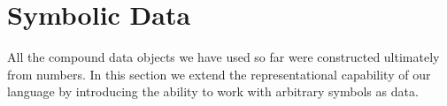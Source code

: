 \section{Symbolic Data}
\label{Section 2.3}

All the compound data objects we have used so far were constructed ultimately from numbers.
In this section we extend the representational capability of our language by introducing the ability to work with arbitrary symbols as data.





